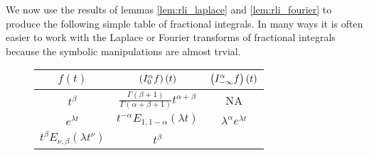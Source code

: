 We now use the results of lemmas \ref{lem:rli_laplace} and \ref{lem:rli_fourier} to produce the following simple table of fractional integrals. In many ways it is often easier to work with the Laplace or Fourier transforms of fractional integrals because the symbolic manipulations are almost trvial.
\begin{figure}[H]
    \begin{tabular}{|c|c|c|}
        \hline
        $ f(t) $ & $\left( I_{0}^{\alpha} f \right)(t) $ & $ \left( I_{-\infty}^{\alpha} f \right)(t) $ \\
        \hline
        $ t^\beta $ & $ \frac{\Gamma(\beta + 1)}{\Gamma(\alpha + \beta + 1)}t^{\alpha + \beta} $ & NA \\ 
        $ e^{\lambda t} $ & $ t^{-\alpha} E_{1,1-\alpha}(\lambda t) $ & $ \lambda^\alpha e^{\lambda t} $ \\
        $ t^\beta E_{\nu, \beta}(\lambda t^\nu) $ & $ t^{\beta} $ \\
    \end{tabular}
\end{figure}

